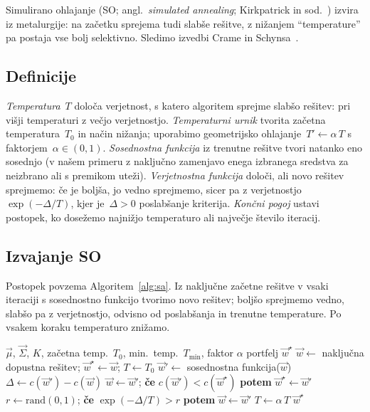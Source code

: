 Simulirano ohlajanje (SO; angl.\ \emph{simulated annealing}; Kirkpatrick in sod.~\cite{kirkpatrick1983}) izvira iz metalurgije: na začetku sprejema tudi slabše rešitve, z nižanjem ``temperature'' pa postaja vse bolj selektivno. Sledimo izvedbi Crame in Schynsa~\cite{cramaschyns2003}.

\subsection{Definicije}
\emph{Temperatura}~$T$ določa verjetnost, s katero algoritem sprejme slabšo rešitev: pri višji temperaturi z večjo verjetnostjo. \emph{Temperaturni urnik} tvorita začetna temperatura~$T_0$ in način nižanja; uporabimo geometrijsko ohlajanje~$T' \gets \alpha\,T$ s faktorjem~$\alpha\in(0,1)$. \emph{Sosednostna funkcija} iz trenutne rešitve tvori natanko eno sosednjo (v našem primeru z naključno zamenjavo enega izbranega sredstva za neizbrano ali s premikom uteži). \emph{Verjetnostna funkcija} določi, ali novo rešitev sprejmemo: če je boljša, jo vedno sprejmemo, sicer pa z verjetnostjo~$\exp(-\Delta/T)$, kjer je~$\Delta>0$ poslabšanje kriterija. \emph{Končni pogoj} ustavi postopek, ko dosežemo najnižjo temperaturo ali največje število iteracij.

\subsection{Izvajanje SO}
Postopek povzema Algoritem~\ref{alg:sa}. Iz naključne začetne rešitve v vsaki iteraciji s sosednostno funkcijo tvorimo novo rešitev; boljšo sprejmemo vedno, slabšo pa z verjetnostjo, odvisno od poslabšanja in trenutne temperature. Po vsakem koraku temperaturo znižamo.

\begin{algorithm}[htbp]
\caption{Simulirano ohlajanje (SO) za KOMV}
\label{alg:sa}
\begin{algorithmic}[1]
\footnotesize
\REQUIRE $\vec{\mu}$, $\vec{\Sigma}$, $K$, začetna temp.\ $T_0$, min.\ temp.\ $T_{\min}$, faktor $\alpha$
\ENSURE portfelj $\vec{w}^\star$
\STATE $\vec{w} \gets$ naključna dopustna rešitev; $\vec{w}^\star \gets \vec{w}$; $T \gets T_0$
  \STATE $\vec{w}' \gets$ sosednostna funkcija($\vec{w}$) 
  \STATE $\Delta \gets c(\vec{w}') - c(\vec{w})$
    \STATE $\vec{w} \gets \vec{w}'$; \textbf{če} $c(\vec{w}') < c(\vec{w}^\star)$ \textbf{potem} $\vec{w}^\star \gets \vec{w}'$
  \ELSE
    \STATE $r \gets \mathrm{rand}(0,1)$; \textbf{če} $\exp(-\Delta/T) > r$ \textbf{potem} $\vec{w} \gets \vec{w}'$
  \ENDIF
  \STATE $T \gets \alpha\,T$ 
\ENDWHILE
\RETURN $\vec{w}^\star$
\end{algorithmic}
\end{algorithm}

